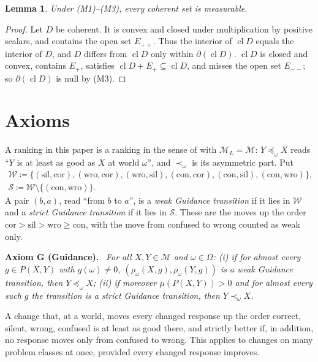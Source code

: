 \documentclass[11pt]{article}
\newtheorem{lemma}[theorem]{Lemma}
\theoremstyle{definition}
\theoremstyle{remark}
\newenvironment{axiom}[1]{\par\medskip\noindent\textbf{Axiom #1.}\ \itshape}{\par\medskip}
\newcommand{\M}{\mathcal M}
\newcommand{\bd}{\partial}
\newcommand{\cl}{\operatorname{cl}}
\newcommand{\cor}{\mathrm{cor}}
\newcommand{\sil}{\mathrm{sil}}
\newcommand{\wro}{\mathrm{wro}}
\newcommand{\con}{\mathrm{con}}
\begin{document}
\begin{lemma}\label{lem:measurable}
Under (M1)--(M3), every coherent set is measurable.
\end{lemma}
\begin{proof}
Let $D$ be coherent. It is convex and closed under multiplication by positive scalars, and contains the open set $E_{++}$. Thus the interior of $\cl D$ equals the interior of $D$, and $D$ differs from $\cl D$ only within $\bd(\cl D)$. $\cl D$ is closed and convex, contains $E_+$, satisfies $\cl D+E_+\subseteq\cl D$, and misses the open set $E_{--}$; so $\bd(\cl D)$ is null by (M3).
\end{proof}

\section{Axioms}\label{sec:axioms}

A ranking in this paper is a ranking in the sense of \cite[Definition~\ref{GR-def:ranking}]{KonekGR} with $\M_L=\M$: $Y\preceq_\omega X$ reads ``$Y$ is at least as good as $X$ at world $\omega$'', and $\prec_\omega$ is its asymmetric part. Put
\begin{gather*}
\mathcal W\coloneqq\{(\sil,\cor),(\wro,\cor),(\wro,\sil),(\con,\cor),(\con,\sil),(\con,\wro)\},\\
\mathcal S\coloneqq\mathcal W\setminus\{(\con,\wro)\}.
\end{gather*}
A pair $(b,a)$, read ``from $b$ to $a$'', is a \emph{weak Guidance transition} if it lies in $\mathcal W$ and a \emph{strict Guidance transition} if it lies in $\mathcal S$. These are the moves up the order $\cor>\sil>\wro\ge\con$, with the move from confused to wrong counted as weak only.

\begin{axiom}{G (Guidance)}
For all $X,Y\in\M$ and $\omega\in\Omega$:
\textup{(i)} if for almost every $g\in P(X,Y)$ with $g(\omega)\ne0$, $(\rho_\omega(X,g),\rho_\omega(Y,g))$ is a weak Guidance transition, then $Y\preceq_\omega X$;
\textup{(ii)} if moreover $\mu(P(X,Y))>0$ and for almost every such $g$ the transition is a strict Guidance transition, then $Y\prec_\omega X$.
\end{axiom}
\noindent A change that, at a world, moves every changed response up the order correct, silent, wrong, confused is at least as good there, and strictly better if, in addition, no response moves only from confused to wrong. This applies to changes on many problem classes at once, provided every changed response improves.
\end{document}
